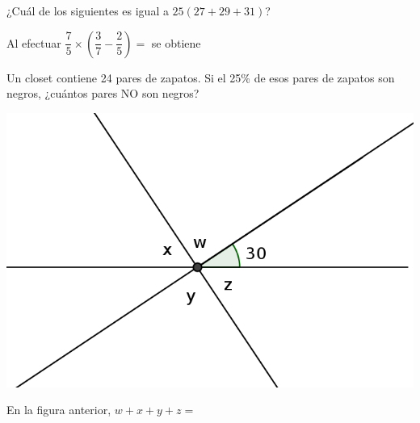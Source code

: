 \documentclass[letterpaper,10pt]{examdesign}
\begin{document}
\begin{multiplechoice}[rearrange=yes,keycolumns=4,examcolumns=2]
\begin{block}
\begin{question}
\end{question}
\end{block}
\begin{question}
¿Cuál de los siguientes es igual a $25(27+29+31)$?
\end{question}
\begin{question}
Al efectuar $\dfrac{7}{5}\times \left(\dfrac{3}{7}-\dfrac{2}{5}\right)=$ \; se obtiene
\end{question}
\begin{question}
Un closet contiene 24 pares de zapatos. Si el 25\% de esos pares de zapatos son negros, ¿cuántos pares NO son negros?
\end{question}
\begin{block}
\includegraphics[scale=1.1]{Images/anguloswxyz.png} 
\begin{question}
En la figura anterior, $w+x+y+z=$
\end{question}
\end{block}
\begin{block}

\end{block}
\end{multiplechoice}
\end{document}
